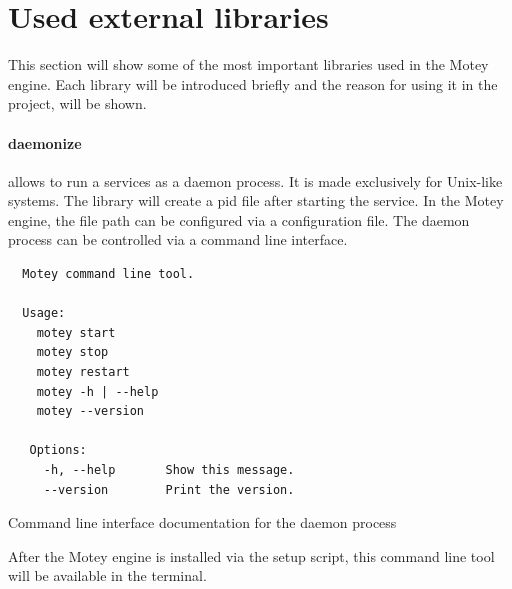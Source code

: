\section{Used external libraries}
This section will show some of the most important libraries used in the Motey engine.
Each library will be introduced briefly and the reason for using it in the project, will be shown.

\paragraph{daemonize}\label{library:daemonize} allows to run a services as a daemon process.
It is made exclusively for Unix-like systems.
The library will create a pid file after starting the service.
In the Motey engine, the file path can be configured via a configuration file.
The daemon process can be controlled via a command line interface.
\begin{listing}[H]
  \begin{verbatim}
  Motey command line tool.

  Usage:
    motey start
    motey stop
    motey restart
    motey -h | --help
    motey --version

   Options:
     -h, --help       Show this message.
     --version        Print the version.
  \end{verbatim}
  \caption{Command line interface documentation for the daemon process}
  \label{code:cli-tool}
\end{listing}
After the Motey engine is installed via the setup script, this command line tool will be available in the terminal.


